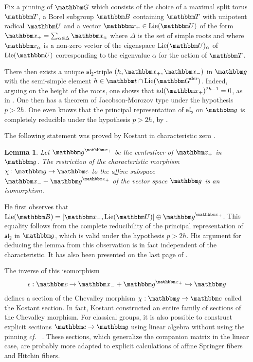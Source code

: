 \documentclass[12pt,english]{smfart}
\numberwithin{equation}{subsection}
\newtheorem{lemme}[equation]{Lemma}
\theoremstyle{remark}
\newcommand\rta{\rightarrow}
\newcommand\GG{{\mathbbm G}}
\newcommand\bbB{{\mathbbm B}}
\newcommand\bbU{{\mathbbm U}}
\newcommand\bbT{{\mathbbm T}}
\newcommand\bbG{{\mathbbm G}}
\newcommand\bbx{{\mathbbm x}}
\newcommand\bbg{{\mathbbm g}}
\newcommand\bbt{{\mathbbm t}}
\newcommand\bbc{{\mathbbm c}}
\newcommand\Lie{{\rm Lie}}
\newcommand\cf{{\it cf.\ }}
\begin{document}
Fix a pinning of $\GG$ which consists of the choice of a maximal
split torus $\bbT$, a Borel subgroup $\bbB$ containing $\bbT$ with
unipotent radical $\bbU$ and a vector $\bbx_{+}\in \Lie(\bbU)$ of the form
$\bbx_+=\sum_{\alpha\in \Delta}\bbx_\alpha$ where $\Delta$ is the set
of simple roots and where $\bbx_\alpha$ is a non-zero vector of the
eigenspace $\Lie(\bbU)_\alpha$ of $\Lie(\bbU)$ corresponding to
the eigenvalue $\alpha$ for the action of $\bbT$.

There then exists a unique $\mathfrak{sl}_2$-triple $(h,\bbx_+,\bbx_-)$ in
$\bbg$ with the semi-simple element $h\in \bbt\cap \Lie(\bbG^{\rm der})$.
Indeed, arguing on the height of the roots, one shows that ${\rm ad}(\bbx_+)^{2h-1}=0$, as in \cite[5.5.2]{Ca}. One then has a theorem of Jacobson-Morozov type \cite[5.3.2]{Ca} under the hypothesis $p>2h$. One even knows that the principal representation of $\mathfrak{sl}_2$ on $\bbg$ is completely reducible under the hypothesis $p>2h$, by \cite[5.4.8]{Ca}.

The following statement was proved by Kostant in characteristic zero \cite[Theorem 0.10]{Kos}.

\begin{lemme}\label{Kostant}
Let $\bbg^{{\bbx}_+}$ be the centralizer of ${\bbx}_+$ in ${\bbg}$. The
restriction of the characteristic morphism $\chi:\bbg\rta\bbc$ to the
affine subspace ${\bbx}_-+\bbg^{{\bbx}_+}$ of the vector space $\bbg$ is an
isomorphism.
\end{lemme}

He first observes that $\Lie(\bbB)=[\bbx_-,\Lie(\bbU)]\oplus\bbg^{\bbx_+}$. This equality follows from the complete reducibility of the principal representation of $\mathfrak{sl}_2$ in $\bbg$, which is valid under the hypothesis $p>2h$. His argument \cite[Prop.~19]{Kos} for deducing the lemma from this observation is in fact independent of the characteristic. It has also been presented on the last page of \cite{BD}.

The inverse of this isomorphism
\begin{equation}
\epsilon:\bbc\rta{\bbx}_-+\bbg^{{\bbx}_+}\hookrightarrow \bbg
\end{equation}
defines a section of the Chevalley morphism $\chi:\bbg\rightarrow\bbc$
called the Kostant section. In fact, Kostant constructed an entire
family of sections of the Chevalley morphism. For classical groups,
it is also possible to construct explicit sections $\bbc\rightarrow \bbg$
using linear algebra without using the pinning \cf
\cite{compagnon}. These sections, which generalize the companion matrix
in the linear case, are probably more adapted to explicit calculations
of affine Springer fibers and Hitchin fibers.
\end{document}
